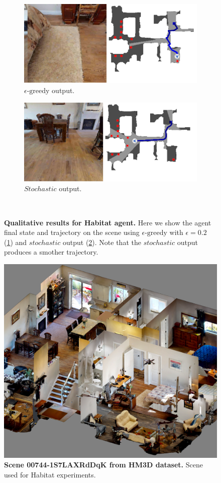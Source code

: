 \begin{figure}
    \centering
    \begin{subfigure}[b]{0.4\textwidth}
        \centering
        \includegraphics[width=\textwidth]{figures/understanding_vsn/qualitative_results/habitat_epsilon}
        \caption{$\epsilon\text{-greedy}$ output.}
        \label{fig:habitat_qualitative_epsilon}
    \end{subfigure}
    \hfill
    \begin{subfigure}[b]{0.4\textwidth}
        \centering
        \includegraphics[width=\textwidth]{figures/understanding_vsn/qualitative_results/habitat_stochastic}
        \caption{$Stochastic$ output.}
        \label{fig:habitat_qualitative_stochastic}
    \end{subfigure}~\caption{\textbf{Qualitative results for Habitat agent.} Here we show the agent final state and trajectory on the scene using $\epsilon\text{-greedy}$ with $\epsilon = 0.2$ (\ref{fig:habitat_qualitative_epsilon}) and $stochastic$ output (\ref{fig:habitat_qualitative_stochastic}). Note that the $stochastic$ output produces a smother trajectory.}
    \label{fig:habitat_qualitative}
\end{figure}

\begin{figure}    
    \centering
    \includegraphics[width=0.6\linewidth]{figures/understanding_vsn/dollhouse}
    \caption{\textbf{Scene 00744-1S7LAXRdDqK from HM3D dataset.} Scene used for Habitat experiments.}
    \label{fig:dollhouse}
\end{figure}
